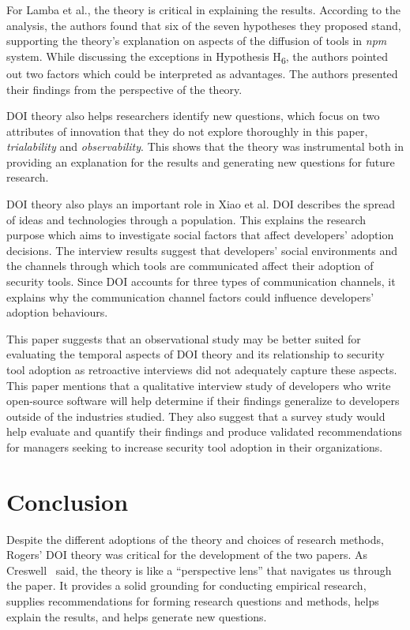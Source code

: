 \documentclass[journal,12pt,onecolumn,]{IEEEtran}
\begin{document}
For Lamba et al., the theory is critical in explaining the results. According to the analysis, the authors found that six of the seven hypotheses they proposed
stand, supporting the theory's explanation on aspects of the diffusion of tools in \textit{npm} system.
While discussing the exceptions in Hypothesis H\textsubscript{6}, the authors pointed out two factors which could be interpreted as advantages.
The authors presented their findings from the perspective of the theory.

DOI theory also helps researchers identify new questions, which focus on two attributes of innovation that they do not explore thoroughly in this paper, \textit{trialability} and \textit{observability}.
This shows that the theory was instrumental both in providing an explanation for the results and generating new questions for future research.

DOI theory also plays an important role in Xiao et al. DOI describes the spread of ideas and technologies through a population. This explains the research purpose which aims to investigate social factors that affect developers' adoption decisions.
The interview results suggest that developers' social environments and the channels through which tools are communicated affect their adoption of security tools. Since DOI accounts for three types of communication channels, it explains why the communication channel factors could influence developers' adoption behaviours.

This paper suggests that an observational study may be better suited for evaluating the temporal aspects of DOI theory and its relationship to security tool adoption as retroactive interviews did not adequately capture these aspects. This paper mentions that a qualitative interview study of developers who write open-source software will help determine if their findings generalize to developers outside of the industries studied.
They also suggest that a survey study would help evaluate and quantify their findings and produce validated recommendations for managers seeking to increase security tool adoption in their organizations.

\section{Conclusion}

Despite the different adoptions of the theory and choices of research methods, Rogers' DOI theory was critical for the development of the two papers.
As Creswell~\cite{creswell2017research} said, the theory is like a ``perspective lens'' that navigates us through the paper. It provides a solid grounding for conducting empirical research, supplies recommendations for forming research questions and methods,
helps explain the results, and helps generate new questions.
\end{document}
